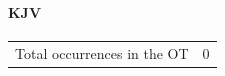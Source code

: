 		\paragraph{KJV}
			\label{AFFIX-OT-KJV}
	
			\begin{tabular}{ll}
				Total occurrences in the OT & 0
			\end{tabular}
			
			
		
			
				
			
